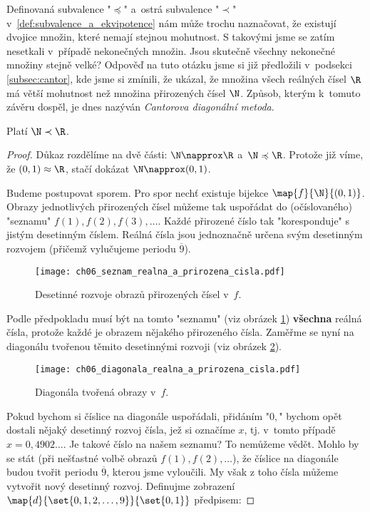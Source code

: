 Definovaná subvalence "$\preccurlyeq$" a~ostrá subvalence "$\prec$" v~\ref{def:subvalence_a_ekvipotence} nám může trochu naznačovat, že existují dvojice množin, které nemají stejnou mohutnost. S takovými jsme se zatím nesetkali v~případě nekonečných množin. Jsou skutečně všechny nekonečné množiny stejně velké? Odpověď na tuto otázku jsme si již předložili v~podsekci \ref{subsec:cantor}, kde jsme si zmínili, že  ukázal, že množina všech reálných čísel $\R$ má větší mohutnost než množina přirozených čísel $\N$. Způsob, kterým k~tomuto závěru dospěl, je dnes nazýván \emph{Cantorova diagonální metoda}.
\begin{theorem}\label{thm:N_a_R}
    Platí $\N\prec\R$.
\end{theorem}
\begin{proof}
    Důkaz rozdělíme na dvě části: $\N\napprox\R$ a~$\N\preccurlyeq\R$. Protože již víme, že $(0,1)\approx\R$, stačí dokázat $\N\napprox(0,1)$.\par
    Budeme postupovat sporem. Pro spor nechť existuje bijekce $\map{f}{\N}{(0,1)}$. Obrazy jednotlivých přirozených čísel můžeme tak uspořádat do (očíslovaného) "seznamu" $f(1),f(2),f(3),\dots$. Každé přirozené číslo tak "koresponduje" s jistým desetinným číslem. Reálná čísla jsou jednoznačně určena svým desetinným rozvojem (přičemž vylučujeme periodu $\overline{9}$).
    \begin{figure}[H]
        \centering
        \texttt{[image: ch06\_seznam\_realna\_a\_prirozena\_cisla.pdf]}
        \caption{Desetinné rozvoje obrazů přirozených čísel v~$f$.}
        \label{fig:seznam_realna_a_prirozena_cisla}
    \end{figure}
    Podle předpokladu musí být na tomto "seznamu" (viz obrázek \ref{fig:seznam_realna_a_prirozena_cisla}) \textbf{všechna} reálná čísla, protože každé je obrazem nějakého přirozeného čísla. Zaměřme se nyní na diagonálu tvořenou těmito desetinnými rozvoji (viz obrázek \ref{fig:diagonala_realna_a_prirozena_cisla}).
    \begin{figure}[H]
        \centering
        \texttt{[image: ch06\_diagonala\_realna\_a\_prirozena\_cisla.pdf]}
        \caption{Diagonála tvořená obrazy v~$f$.}
        \label{fig:diagonala_realna_a_prirozena_cisla}
    \end{figure}
    Pokud bychom si číslice na diagonále uspořádali, přidáním "$0,$" bychom opět dostali nějaký desetinný rozvoj čísla, jež si označíme $x$, tj. v~tomto případě $x=0,4902\dots$. Je takové číslo na našem seznamu? To nemůžeme vědět. Mohlo by se stát (při nešťastné volbě obrazů $f(1),f(2),\dots$), že číslice na diagonále budou tvořit periodu $\overline{9}$, kterou jsme vyloučili. My však z toho čísla můžeme vytvořit nový desetinný rozvoj. Definujme zobrazení $\map{d}{\set{0,1,2,\dots,9}}{\set{0,1}}$ předpisem:

\end{proof}
